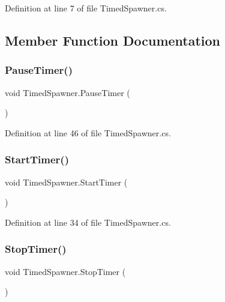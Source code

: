 Definition at line 7 of file Timed\+Spawner.\+cs.



\subsection{Member Function Documentation}
\mbox{\label{class_timed_spawner_abf68808965e5d37fdd2ef4a92822df4f}} 
\subsubsection{\texorpdfstring{Pause\+Timer()}{PauseTimer()}}
{\footnotesize\ttfamily void Timed\+Spawner.\+Pause\+Timer (\begin{DoxyParamCaption}{ }\end{DoxyParamCaption})}



Definition at line 46 of file Timed\+Spawner.\+cs.

\mbox{\label{class_timed_spawner_af79fc468787120b9f052aecbbfffef38}} 
\subsubsection{\texorpdfstring{Start\+Timer()}{StartTimer()}}
{\footnotesize\ttfamily void Timed\+Spawner.\+Start\+Timer (\begin{DoxyParamCaption}{ }\end{DoxyParamCaption})}



Definition at line 34 of file Timed\+Spawner.\+cs.

\mbox{\label{class_timed_spawner_a0e3fed885d7c03676d7c963daf23423a}} 
\subsubsection{\texorpdfstring{Stop\+Timer()}{StopTimer()}}
{\footnotesize\ttfamily void Timed\+Spawner.\+Stop\+Timer (\begin{DoxyParamCaption}{ }\end{DoxyParamCaption})}



